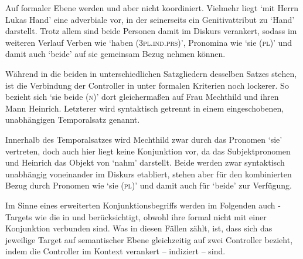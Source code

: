 Auf formaler Ebene werden  und  aber nicht koordiniert.
Vielmehr liegt  `mit Herrn Lukas Hand' eine
adverbiale  vor, in der 
seinerseits ein Genitivattribut zu  `Hand' darstellt.
Trotz allem sind beide Personen damit im Diskurs verankert,
sodass im weiteren Verlauf Verben wie  `haben
(\textsc{3pl.ind.prs})', Pronomina wie  `sie (\textsc{pl})' und damit
auch  `beide' auf sie gemeinsam Bezug nehmen können.

Während in  die beiden  in
unterschiedlichen Satzgliedern desselben Satzes stehen, ist die Verbindung der
Controller in  unter formalen Kriterien noch lockerer.
So bezieht sich  `sie beide (\textsc{n})' dort gleichermaßen auf
Frau Mechthild und ihren Mann Heinrich. Letzterer wird syntaktisch getrennt in
einem eingeschobenen, unabhängigen Temporalsatz genannt.


Innerhalb des Temporalsatzes wird Mechthild zwar durch das Pronomen 
`sie' vertreten, doch auch hier liegt keine Konjunktion vor, da  das
Subjektpronomen und Heinrich das Objekt von  `nahm' darstellt. Beide
 werden zwar syntaktisch unabhängig voneinander im Diskurs
etabliert, stehen aber für den kombinierten Bezug durch Pronomen wie
 `sie (\textsc{pl})' und damit auch für 
`beide' zur Verfügung.

Im Sinne eines erweiterten Konjunktionsbegriffs werden im Folgenden auch
-Targets wie die in  und
 berücksichtigt, obwohl ihre  formal
nicht mit einer Konjunktion verbunden sind. Was in diesen Fällen zählt, ist,
dass sich das jeweilige Target auf semantischer Ebene gleichzeitig auf zwei
Controller bezieht, indem die Controller im Kontext
verankert -- indiziert -- sind.

